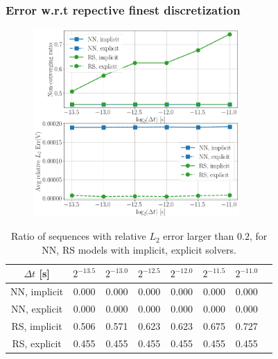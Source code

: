 \subsubsection{Error w.r.t repective finest discretization}
\begin{figure}[H]
    \centering
    \includegraphics[width=0.7\textwidth]{images/err_timesteps_rs_nn_0531_universal.png}
\end{figure}
\begin{table}[H]
    \centering
    \begin{tabular}{cccccccc}
        \hline
        $\Delta t$ [s] & $2^{-13.5}$ & $2^{-13.0}$ & $2^{-12.5}$ & $2^{-12.0}$ & $2^{-11.5}$ & $2^{-11.0}$ \\
        \hline
        NN, implicit & 0.000 & 0.000 & 0.000 & 0.000 & 0.000 & 0.000 \\
        NN, explicit & 0.000 & 0.000 & 0.000 & 0.000 & 0.000 & 0.000 \\
        RS, implicit & 0.506 & 0.571 & 0.623 & 0.623 & 0.675 & 0.727 \\
        RS, explicit & 0.455 & 0.455 & 0.455 & 0.455 & 0.455 & 0.455 \\
        \hline
    \end{tabular}
    \caption{Ratio of sequences with relative $L_2$ error larger than $0.2$,  
    for NN, RS models with implicit, explicit solvers.}
    \label{tab:NaNRatioSpringSliderRsVsNNUniversal}
\end{table}

